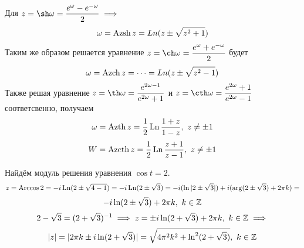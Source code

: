 \documentclass[../../main.tex]{subfiles}
\begin{document}
Для $ z = \sh \omega = \dfrac{e^{\omega} - e^{-\omega}}{2} \implies $
\begin{equation}
\label{lec27:29}
\omega = \operatorname{Azsh} z = Ln(z \pm \sqrt{z^2 + 1})
\end{equation}
Таким же образом решается уравнение $ z = \ch \omega = \dfrac{e^{\omega} + 
e^{-\omega}}{2} $ будет 
\begin{equation}
\label{lec27:30}
\omega = \operatorname{Azch} z = \dots = Ln(z \pm \sqrt{z^2 - 1})
\end{equation}
Также решая уравнение $ z = \th 
\omega = \dfrac{e^{2\omega - 1}}{e^{2\omega} + 1} $ и 
$ z = \cth \omega = \dfrac{e^{2\omega} + 1}{e^{2\omega} - 1} $ соответсвенно,
получаем
\begin{equation}
\label{lec27:31}
\omega = \operatorname{Azth} z = \dfrac{1}{2} \operatorname{Ln} \dfrac{1 + z}{1 - z},\ z \neq \pm 1
\end{equation}
\begin{equation}
\label{lec27:32}
W = \operatorname{Azcth} z = \dfrac{1}{2} \operatorname{Ln} \dfrac{z + 1}{z - 1},\
z \neq \pm 1
\end{equation}
\begin{exmp}
	Найдём модуль решения уравнения $ \cos t = 2 $.
	\[
	z = \operatorname{Arccos} 2 = -i\operatorname{Ln}(2 \pm \sqrt{4 - 1}) = 
	-i \operatorname{Ln}(2 \pm \sqrt{3}) = -i (\ln|2 \pm \sqrt{3}|) + i(\arg(2 \pm \sqrt{3}) + 
	2\pi k) = \]\[
	-i \ln(2 \pm \sqrt{3}) + 2\pi k,\ k \in \mathbb{Z}	
	\]
	\[
	2 - \sqrt{3} = (2 + \sqrt{3})^{-1} \implies
	z = \pm i \ln (2 + \sqrt{3}) + 2\pi k,\ k \in \mathbb{Z} \implies \] \[
	|z| = |2\pi k \pm i\ln(2 + \sqrt{3})| = 
	\sqrt{4\pi^2 k^2 + \ln^2(2 + \sqrt{3})},\ k \in \mathbb{Z}
	\]
\end{exmp}
\end{document}
